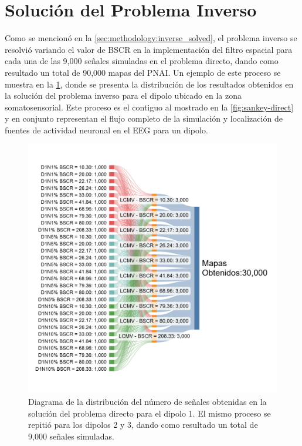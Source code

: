 \section{Solución del Problema Inverso}
\label{sec:results:inverse}

Como se mencionó en la \cref{sec:methodology:inverse_solved}, el problema inverso se resolvió variando el valor de BSCR en la implementación del filtro espacial para cada una de las 9,000 señales simuladas en el problema directo, dando como resultado un total de 90,000 mapas del PNAI.
Un ejemplo de este proceso se muestra en la \cref{fig:sankey-inverse}, donde se presenta la distribución de los resultados obtenidos en la solución del problema inverso para el dipolo ubicado en la zona somatosensorial. 
Este proceso es el contiguo al mostrado en la \cref{fig:sankey-direct} y en conjunto representan el flujo completo de la simulación y localización de fuentes de actividad neuronal en el EEG para un dipolo.

\begin{figure}[tb]
    \centering
    \includegraphics[width=\textwidth]{gfx/sankey-inverse.png}
    \caption{Diagrama de la distribución del número de señales obtenidas en la solución del problema directo para el dipolo 1. El mismo proceso se repitió para los dipolos 2 y 3, dando como resultado un total de 9,000 señales simuladas.}
    \label{fig:sankey-inverse}
\end{figure}

